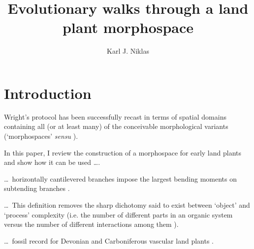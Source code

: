 \documentclass{article}
\newcommand{\latin}{\emph}
\begin{document}
\title{Evolutionary walks through a land plant morphospace}
\author{Karl J. Niklas}
\def\jinfo{Journal of Experimental Botany, Vol. 50, No. 330, pp. 39-52,
  January 1999, \copyright\ Oxford University Press 1999}

\maketitle
\section{Introduction}

Wright's protocol has been successfully recast in terms of spatial
domains containing all (or at least many) of the conceivable
morphological variants (`morphospaces' \latin{sensu}
).

In this paper, I review the construction of a morphospace for early land
plants
\cites{NK84,N97-adaptive-walks,N97-effects}
and show how it can be used \ldots.

\ldots\ horizontally cantilevered branches impose the largest bending
moments on subtending branches
\cites{N92,N94-allometry}.

\ldots\ This definition removes the sharp dichotomy said to exist
between `object' and `process' complexity (i.e. the number of different
parts in an organic system versus the number of different interactions
among them \cite{M96}).

\ldots\ fossil record for Devonian and Carboniferous vascular land
plants \cites{NTK80,NTK83,GA84}.
\end{document}
